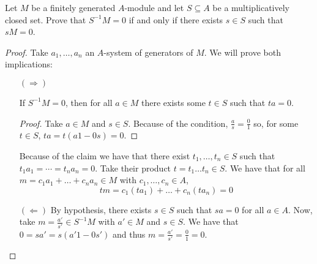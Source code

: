 \begin{problem}
    Let $M$ be a finitely generated $A$-module and let $S \subseteq A$ be a multiplicatively closed set.
    Prove that $S^{-1}M = 0$ if and only if there exists $s \in S$ such that $sM = 0$.
    \begin{sol}
        \begin{proof}
            Take $a_1, \dots, a_n$ an $A$-system of generators of $M$.
            We will prove both implications:
            \begin{itemize}
                \item[$(\Rightarrow)$]
                \begin{claim}
                    If $S^{-1}M = 0$, then for all $a \in M$ there exists some $t \in S$ such that $t a = 0$.
                    \begin{proof}
                        Take $a \in M$ and $s \in S$.
                        Because of the condition, $\frac{a}{s} = \frac{0}{1}$
                        so, for some $t \in S$, $ta = t (a 1 - 0 s) = 0$.
                    \end{proof}
                \end{claim}
                Because of the claim we have that there exist $t_1, \dots, t_n \in S$ such that \linebreak
                ${t_1 a_1 = \cdots = t_n a_n = 0}$.
                Take their product $t = t_1 \dots t_n \in S$.
                We have that for all $m = c_1 a_1 + \dots + c_n a_n \in M$ with $c_1, \dots, c_n \in A$,
                \[
                    t m = c_1 (t a_1) + \dots + c_n (t a_n) = 0
                \]

                \item[$(\Leftarrow)$]
                By hypothesis, there exists $s \in S$ such that $s a = 0$ for all $a \in A$.
                Now, take ${m = \frac{a'}{s'} \in S^{-1}M}$ with $a' \in M$ and $s \in S$.
                We have that $0 = s a' = s (a' 1 - 0 s')$ and thus $m = \frac{a'}{s'} = \frac{0}{1} = 0$.
            \end{itemize}
        \end{proof}
    \end{sol}
\end{problem}